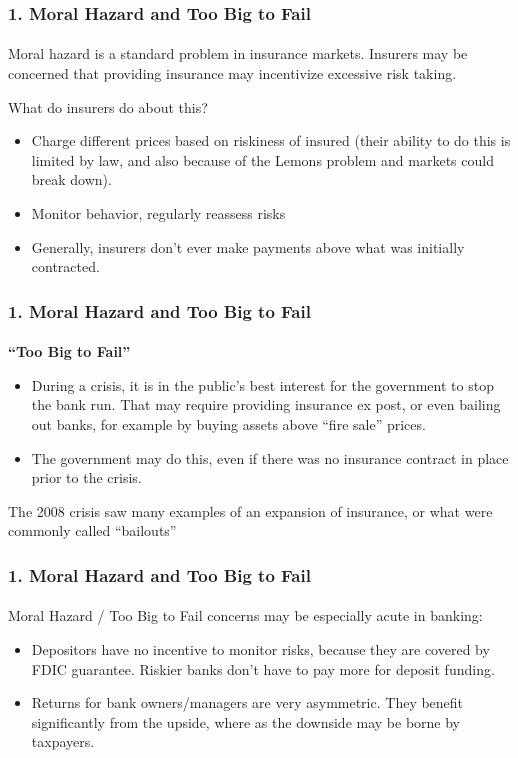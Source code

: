 \documentclass{beamer}
\begin{document}
\begin{frame}[t]
\frametitle{1. Moral Hazard and Too Big to Fail}
\framesubtitle{}

    Moral hazard is a standard problem in insurance markets.   Insurers may be concerned that providing insurance may incentivize excessive risk taking.
    \vspace{1em}
    
    What do insurers do about this?
    
    \begin{itemize}
        \item Charge different prices based on riskiness of insured (their ability to do this is limited by law, and also because of the Lemons problem and markets could break down).
        \item Monitor behavior, regularly reassess risks
        \item Generally, insurers don’t ever make payments above what was initially contracted.
    \end{itemize}

\end{frame}

\begin{frame}[t]
\frametitle{1. Moral Hazard and Too Big to Fail}
\framesubtitle{}

    \textbf{“Too Big to Fail”}
    \vspace{1em}
    
    \begin{itemize}
        \item During a crisis, it is in the public’s best interest for the government to stop the bank run.   That may require providing insurance ex post, or even bailing out banks, for example by buying assets above “fire sale” prices.
        \item The government may do this, even if there was no insurance contract in place prior to the crisis.
    \end{itemize}
    \vspace{1em}
    
    The 2008 crisis saw many examples of an expansion of insurance, or what were commonly called  “bailouts”

\end{frame}

\begin{frame}[t]
\frametitle{1. Moral Hazard and Too Big to Fail}
\framesubtitle{}

    Moral Hazard / Too Big to Fail concerns may be especially acute in banking:
    
    \begin{itemize}
        \item Depositors have no incentive to monitor risks, because they are covered by FDIC guarantee. Riskier banks don’t have to pay more for deposit funding.
        \item Returns for bank owners/managers are very asymmetric.  They benefit significantly from the upside, where as the downside may be borne by taxpayers.
    \end{itemize}

\end{frame}
\end{document}
